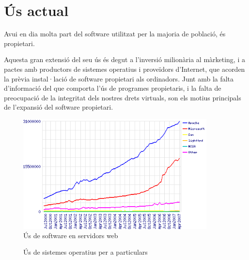 \section{Ús actual}

	Avui en dia molta part del software utilitzat per la majoria de població, és propietari.

	Aquesta gran extensió del seu ús és degut a l'inversió milionària al màrketing, i a
	pactes amb productors de sistemes operatius i proveïdors d'Internet, que acorden la
	prèvia instal·lació de software propietari als ordinadors. Junt amb la falta d'informació del que 
	comporta l'ús de programes propietaris, i la falta de preocupació de la integritat dels
	nostres drets virtuals, son els motius principals de l'expansió del software propietari.

	\begin{figure}[ht!]
	\centering
	\includegraphics[width=100mm]{data/web_servers_share.png}
	\caption{Ús de software en servidors web \cite{whyfoss}}
	\label{websshare}
	\end{figure}

	\begin{figure}[h!]
	\centering
	\caption{Ús de sistemes operatius per a particulars \cite{osstats}}
	\label{osshare}
	\end{figure}

